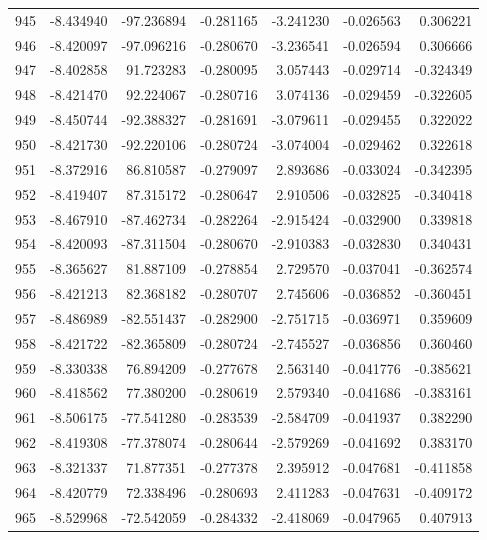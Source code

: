 \begin{tabular}{rrrrrrr}
 945 &  -8.434940 &  -97.236894 & -0.281165 &  -3.241230 &  -0.026563 &  0.306221 \\
 946 &  -8.420097 &  -97.096216 & -0.280670 &  -3.236541 &  -0.026594 &  0.306666 \\
 947 &  -8.402858 &   91.723283 & -0.280095 &   3.057443 &  -0.029714 & -0.324349 \\
 948 &  -8.421470 &   92.224067 & -0.280716 &   3.074136 &  -0.029459 & -0.322605 \\
 949 &  -8.450744 &  -92.388327 & -0.281691 &  -3.079611 &  -0.029455 &  0.322022 \\
 950 &  -8.421730 &  -92.220106 & -0.280724 &  -3.074004 &  -0.029462 &  0.322618 \\
 951 &  -8.372916 &   86.810587 & -0.279097 &   2.893686 &  -0.033024 & -0.342395 \\
 952 &  -8.419407 &   87.315172 & -0.280647 &   2.910506 &  -0.032825 & -0.340418 \\
 953 &  -8.467910 &  -87.462734 & -0.282264 &  -2.915424 &  -0.032900 &  0.339818 \\
 954 &  -8.420093 &  -87.311504 & -0.280670 &  -2.910383 &  -0.032830 &  0.340431 \\
 955 &  -8.365627 &   81.887109 & -0.278854 &   2.729570 &  -0.037041 & -0.362574 \\
 956 &  -8.421213 &   82.368182 & -0.280707 &   2.745606 &  -0.036852 & -0.360451 \\
 957 &  -8.486989 &  -82.551437 & -0.282900 &  -2.751715 &  -0.036971 &  0.359609 \\
 958 &  -8.421722 &  -82.365809 & -0.280724 &  -2.745527 &  -0.036856 &  0.360460 \\
 959 &  -8.330338 &   76.894209 & -0.277678 &   2.563140 &  -0.041776 & -0.385621 \\
 960 &  -8.418562 &   77.380200 & -0.280619 &   2.579340 &  -0.041686 & -0.383161 \\
 961 &  -8.506175 &  -77.541280 & -0.283539 &  -2.584709 &  -0.041937 &  0.382290 \\
 962 &  -8.419308 &  -77.378074 & -0.280644 &  -2.579269 &  -0.041692 &  0.383170 \\
 963 &  -8.321337 &   71.877351 & -0.277378 &   2.395912 &  -0.047681 & -0.411858 \\
 964 &  -8.420779 &   72.338496 & -0.280693 &   2.411283 &  -0.047631 & -0.409172 \\
 965 &  -8.529968 &  -72.542059 & -0.284332 &  -2.418069 &  -0.047965 &  0.407913 \\

\end{tabular}
